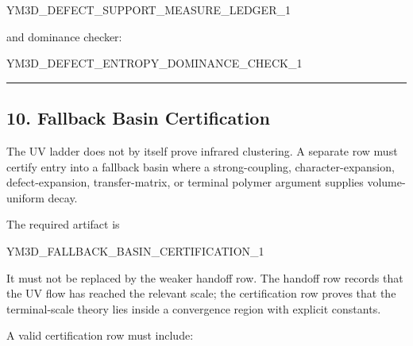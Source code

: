 \documentclass[
]{article}
\newenvironment{Shaded}{}{}
\newcommand{\NormalTok}[1]{#1}
\begin{document}
\begin{Shaded}
\begin{Highlighting}[]
\NormalTok{YM3D\_DEFECT\_SUPPORT\_MEASURE\_LEDGER\_1}
\end{Highlighting}
\end{Shaded}

and dominance checker:

\begin{Shaded}
\begin{Highlighting}[]
\NormalTok{YM3D\_DEFECT\_ENTROPY\_DOMINANCE\_CHECK\_1}
\end{Highlighting}
\end{Shaded}

\begin{center}\rule{0.5\linewidth}{0.5pt}\end{center}

\subsection{10. Fallback Basin
Certification}\label{fallback-basin-certification}

The UV ladder does not by itself prove infrared clustering. A separate
row must certify entry into a fallback basin where a strong-coupling,
character-expansion, defect-expansion, transfer-matrix, or terminal
polymer argument supplies volume-uniform decay.

The required artifact is

\begin{Shaded}
\begin{Highlighting}[]
\NormalTok{YM3D\_FALLBACK\_BASIN\_CERTIFICATION\_1}
\end{Highlighting}
\end{Shaded}

It must not be replaced by the weaker handoff row. The handoff row
records that the UV flow has reached the relevant scale; the
certification row proves that the terminal-scale theory lies inside a
convergence region with explicit constants.

A valid certification row must include:
\end{document}

